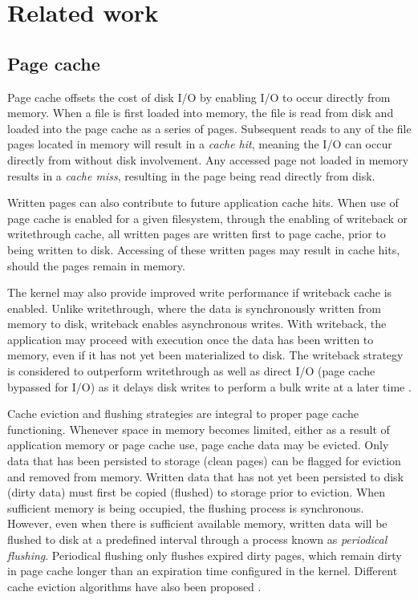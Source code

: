\chapter{Related work}

\section{Page cache}

Page cache offsets the cost of disk I/O by enabling I/O to occur directly from memory.
When a file is first loaded into memory, the file is read from disk and loaded into the page cache as
a series of pages. Subsequent reads to any of the file pages located in memory will result in
a \textit{cache hit}, meaning the I/O can occur directly from without disk involvement.
Any accessed page not loaded in memory results in a \textit{cache miss}, resulting in
the page being read directly from disk.

Written pages can also contribute to future application cache hits. When use of page cache
is enabled for a given filesystem, through the enabling of writeback or writethrough cache,
all written pages are written first to page cache, prior to being written to disk.
Accessing of these written pages may result in cache hits, should the pages remain in memory.

The kernel may also provide improved write performance if writeback cache is enabled. Unlike writethrough,
where the data is synchronously written from memory to disk, writeback enables asynchronous writes.
With writeback, the application may proceed with execution once the data has been
written to memory, even if it has not yet been materialized to disk.  
The writeback strategy is considered to outperform writethrough as well as
direct I/O (page cache bypassed for I/O) as it delays disk writes to perform a bulk write at a later time
\cite{linuxdev3rd2010}.

Cache eviction and flushing strategies are integral to proper page cache functioning.
Whenever space in memory becomes limited, either as a result of application memory
or page cache use, page cache data may be evicted. Only data that
has been persisted to storage (clean pages) can be flagged for eviction and removed from
memory. Written data that has not yet been persisted to disk (dirty data) must first
be copied (flushed) to storage prior to eviction. When sufficient memory is
being occupied, the flushing process is synchronous. However, even when
there is sufficient available memory, written data will be flushed to disk
at a predefined interval through a process known as \textit{periodical flushing}.
Periodical flushing only flushes expired dirty pages, which remain dirty in
page cache longer than an expiration time configured in the kernel.
Different cache eviction algorithms have also been proposed
\cite{owda2014comparison}.

